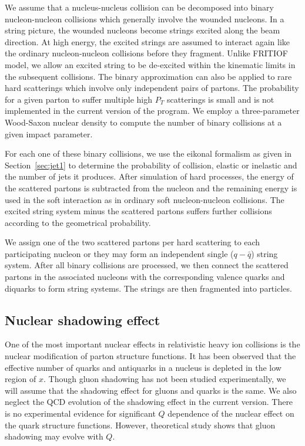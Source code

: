         We assume that a nucleus-nucleus collision can be decomposed 
into binary nucleon-nucleon collisions which generally involve the 
wounded nucleons. In a string picture, the wounded nucleons become strings 
excited along the beam direction. At high energy, the excited strings
are assumed to interact again like the ordinary nucleon-nucleon 
collisions before they fragment. Unlike FRITIOF model, we allow 
an excited string to be de-excited within the kinematic limits 
in the subsequent collisions.
The binary approximation can also be applied to rare hard 
scatterings which involve only independent pairs of partons. The
probability for a given parton to suffer multiple high $P_T$
scatterings is small and is not implemented in the current
version of the program. We employ a three-parameter Wood-Saxon
nuclear density to compute the number of binary collisions
at a given impact parameter.

        For each one of these binary collisions, we use 
the eikonal formalism as given in Section~\ref{sec:jet1}
to  determine the probability of collision, elastic or 
inelastic and the number of jets it produces.  After simulation
of hard processes, the energy of the scattered partons is 
subtracted from the nucleon and the remaining energy is used 
in the soft interaction as in ordinary soft nucleon-nucleon 
collisions. The excited string system minus the scattered 
partons suffers further collisions according to the geometrical
probability.

        We assign one of the two scattered partons per hard 
scattering to each participating nucleon or they may form an 
independent single ($q-\bar{q}$) string system.  After all 
binary collisions are processed, we then connect the scattered 
partons in the associated nucleons with the corresponding 
valence quarks and diquarks to form string systems. The strings 
are then fragmented into particles.

\subsection{Nuclear shadowing effect}

        One of the most important nuclear effects in relativistic
heavy ion collisions is the nuclear modification of parton 
structure functions. It has been observed\cite{shadow1} 
that the effective number of quarks and antiquarks in a 
nucleus is depleted in the low region of $x$. Though gluon
shadowing has not been studied experimentally, we  will assume
that the shadowing effect for gluons and quarks is the same. 
We also neglect the QCD evolution of the shadowing effect in the
current version.  There is no experimental evidence for significant 
$Q$ dependence of the nuclear effect on the quark structure functions.  
However, theoretical study\cite{eskola93} shows that gluon shadowing may 
evolve with $Q$.

